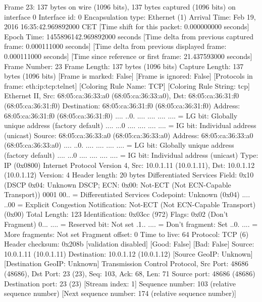 Frame 23: 137 bytes on wire (1096 bits), 137 bytes captured (1096 bits) on interface 0
    Interface id: 0
    Encapsulation type: Ethernet (1)
    Arrival Time: Feb 19, 2016 16:35:42.969892000 CET
    [Time shift for this packet: 0.000000000 seconds]
    Epoch Time: 1455896142.969892000 seconds
    [Time delta from previous captured frame: 0.000111000 seconds]
    [Time delta from previous displayed frame: 0.000111000 seconds]
    [Time since reference or first frame: 21.437593000 seconds]
    Frame Number: 23
    Frame Length: 137 bytes (1096 bits)
    Capture Length: 137 bytes (1096 bits)
    [Frame is marked: False]
    [Frame is ignored: False]
    [Protocols in frame: eth:ip:tcp:telnet]
    [Coloring Rule Name: TCP]
    [Coloring Rule String: tcp]
Ethernet II, Src: 68:05:ca:36:33:a0 (68:05:ca:36:33:a0), Dst: 68:05:ca:36:31:f0 (68:05:ca:36:31:f0)
    Destination: 68:05:ca:36:31:f0 (68:05:ca:36:31:f0)
        Address: 68:05:ca:36:31:f0 (68:05:ca:36:31:f0)
        .... ..0. .... .... .... .... = LG bit: Globally unique address (factory default)
        .... ...0 .... .... .... .... = IG bit: Individual address (unicast)
    Source: 68:05:ca:36:33:a0 (68:05:ca:36:33:a0)
        Address: 68:05:ca:36:33:a0 (68:05:ca:36:33:a0)
        .... ..0. .... .... .... .... = LG bit: Globally unique address (factory default)
        .... ...0 .... .... .... .... = IG bit: Individual address (unicast)
    Type: IP (0x0800)
Internet Protocol Version 4, Src: 10.0.1.11 (10.0.1.11), Dst: 10.0.1.12 (10.0.1.12)
    Version: 4
    Header length: 20 bytes
    Differentiated Services Field: 0x10 (DSCP 0x04: Unknown DSCP; ECN: 0x00: Not-ECT (Not ECN-Capable Transport))
        0001 00.. = Differentiated Services Codepoint: Unknown (0x04)
        .... ..00 = Explicit Congestion Notification: Not-ECT (Not ECN-Capable Transport) (0x00)
    Total Length: 123
    Identification: 0x03cc (972)
    Flags: 0x02 (Don't Fragment)
        0... .... = Reserved bit: Not set
        .1.. .... = Don't fragment: Set
        ..0. .... = More fragments: Not set
    Fragment offset: 0
    Time to live: 64
    Protocol: TCP (6)
    Header checksum: 0x208b [validation disabled]
        [Good: False]
        [Bad: False]
    Source: 10.0.1.11 (10.0.1.11)
    Destination: 10.0.1.12 (10.0.1.12)
    [Source GeoIP: Unknown]
    [Destination GeoIP: Unknown]
Transmission Control Protocol, Src Port: 48686 (48686), Dst Port: 23 (23), Seq: 103, Ack: 68, Len: 71
    Source port: 48686 (48686)
    Destination port: 23 (23)
    [Stream index: 1]
    Sequence number: 103    (relative sequence number)
    [Next sequence number: 174    (relative sequence number)]
